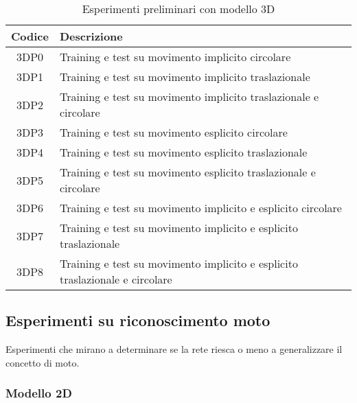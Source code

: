 \begin{table}[H]
	\begin{tabularx}{\textwidth}{|c|X|}
		\hline 
		\textbf{Codice} &
		\textbf{Descrizione} \\ 
		
		\hline 3DP0 &
		Training e test su movimento implicito circolare \\ 
		
		\hline 3DP1 &
		Training e test su movimento implicito traslazionale \\ 
		
		\hline 3DP2 & 
		Training e test su movimento implicito traslazionale e circolare \\
		
		\hline 3DP3 &
		Training e test su movimento esplicito circolare \\ 
		
		\hline 3DP4 &
		Training e test su movimento esplicito traslazionale \\ 
		
		\hline 3DP5 & 
		Training e test su movimento esplicito traslazionale e circolare \\ 
		
		\hline 3DP6 &
		Training e test su movimento implicito e esplicito circolare \\ 
		
		\hline 3DP7 &
		Training e test su movimento implicito e esplicito traslazionale \\ 
		
		\hline 3DP8 & 
		Training e test su movimento implicito e esplicito traslazionale e circolare \\ 
		\hline 
	\end{tabularx}
	\caption{Esperimenti preliminari con modello 3D}
	\label{esperimenti-preliminari-3D}
\end{table}

\subsection{Esperimenti su riconoscimento moto}

Esperimenti che mirano a determinare se la rete riesca o meno a generalizzare il concetto di moto.

\subsubsection{Modello 2D}

